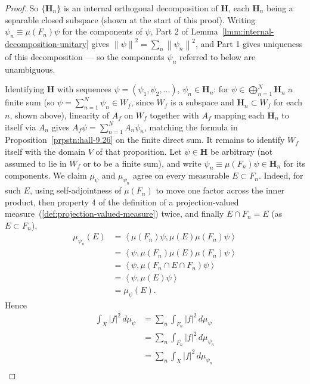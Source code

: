 \begin{proof}
So $\{\mathbf{H}_n\}$ is an internal orthogonal decomposition of $\mathbf{H}$, each $\mathbf{H}_n$ being a separable closed subspace (shown at the start of this proof). Writing $\psi_n \equiv \mu(F_n)\psi$ for the components of $\psi$, Part 2 of Lemma~\ref{lmm:internal-decomposition-unitary} gives $\left\| \psi \right\|^2 = \sum_n \left\| \psi_n \right\|^2$, and Part 1 gives uniqueness of this decomposition — so the components $\psi_n$ referred to below are unambiguous.

Identifying $\mathbf{H}$ with sequences $\psi = (\psi_1, \psi_2, \ldots)$, $\psi_n \in \mathbf{H}_n$: for $\psi \in \bigoplus_{n=1}^N \mathbf{H}_n$ a finite sum (so $\psi = \sum_{n=1}^N \psi_n \in W_f$, since $W_f$ is a subspace and $\mathbf{H}_n \subset W_f$ for each $n$, shown above), linearity of $A_f$ on $W_f$ together with $A_f$ mapping each $\mathbf{H}_n$ to itself via $A_n$ gives $A_f\psi = \sum_{n=1}^N A_n\psi_n$, matching the formula in Proposition~\ref{prpstn:hall-9.26} on the finite direct sum. It remains to identify $W_f$ itself with the domain $V$ of that proposition. Let $\psi \in \mathbf{H}$ be arbitrary (not assumed to lie in $W_f$ or to be a finite sum), and write $\psi_n \equiv \mu(F_n)\psi \in \mathbf{H}_n$ for its components. We claim $\mu_\psi$ and $\mu_{\psi_n}$ agree on every measurable $E \subset F_n$. Indeed, for such $E$, using self-adjointness of $\mu(F_n)$ to move one factor across the inner product, then property 4 of the definition of a projection-valued measure~(\ref{def:projection-valued-measure}) twice, and finally $E \cap F_n = E$ (as $E \subset F_n$),
\begin{align}
    \mu_{\psi_n}(E) &= \left< \mu(F_n)\psi, \mu(E)\mu(F_n)\psi \right> \\
                &= \left< \psi, \mu(F_n)\mu(E)\mu(F_n)\psi \right> \\
                &= \left< \psi, \mu(F_n \cap E \cap F_n)\psi \right> \\
                &= \left< \psi, \mu(E)\psi \right> \\
                &= \mu_\psi(E).
\end{align}
Hence
\begin{align}
    \int_X \lvert f \rvert^2 \, d\mu_\psi &= \sum_n \int_{F_n} \lvert f \rvert^2 \, d\mu_\psi \\
                &= \sum_n \int_{F_n} \lvert f \rvert^2 \, d\mu_{\psi_n} \\
                &= \sum_n \int_X \lvert f \rvert^2 \, d\mu_{\psi_n} \\

\end{align}
\end{proof}
